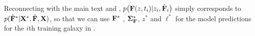 \documentclass[aps,prd,showpacs,superscriptaddress,groupedaddress]{revtex4}  %
\begin{document}
Reconnecting with the main text and , $p\bigl( \mat{F}(z, t_i)| z_i, \hat{\mat{F}}_i\bigr)$  simply corresponds to $p( \hat{\mat{F}}^* | \mat{X}^*, \hat{\mat{F}}, \mat{X} )$, so that we can use $\mat{F}^*$ , $\mat{\Sigma_{{\mat{F}}}^*}$, $z^*$ and $\ell^*$ for the model predictions for the $i$th training galaxy in .

\end{document}
